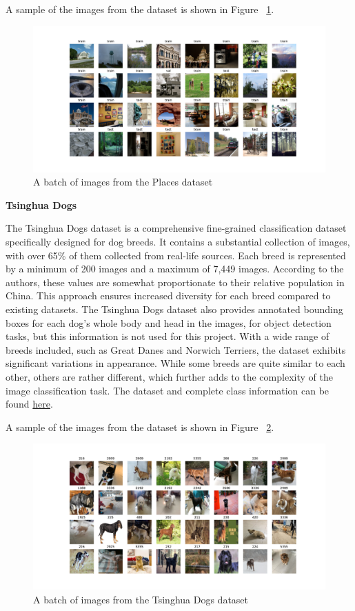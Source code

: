 A sample of the images from the dataset is shown in Figure ~\ref{fig:places}.

\begin{figure}[!htb]
    \centering
    \includegraphics[width=1\textwidth]{images/places256.pdf}
    \caption{A batch of images from the Places dataset}
    \label{fig:places}
\end{figure}


\textbf{Tsinghua Dogs}

The Tsinghua Dogs dataset \cite{zouNewDatasetDog2020} is a comprehensive fine-grained classification dataset specifically designed for dog breeds. It contains a substantial collection of images, with over 65\% of them collected from real-life sources. Each breed is represented by a minimum of 200 images and a maximum of 7,449 images. According to the authors, these values are somewhat proportionate to their relative population in China. This approach ensures increased diversity for each breed compared to existing datasets. The Tsinghua Dogs dataset also provides annotated bounding boxes for each dog's whole body and head in the images, for object detection tasks, but this information is not used for this project. With a wide range of breeds included, such as Great Danes and Norwich Terriers, the dataset exhibits significant variations in appearance. While some breeds are quite similar to each other, others are rather different, which further adds to the complexity of the image classification task. 
The dataset and complete class information can be found \href{https://cg.cs.tsinghua.edu.cn/ThuDogs/}{here}.

A sample of the images from the dataset is shown in Figure ~\ref{fig:tsing}.

\begin{figure}[!htb]
    \centering
    \includegraphics[width=1\textwidth]{images/tsing.pdf}
    \caption{A batch of images from the Tsinghua Dogs dataset}
    \label{fig:tsing}
\end{figure}


